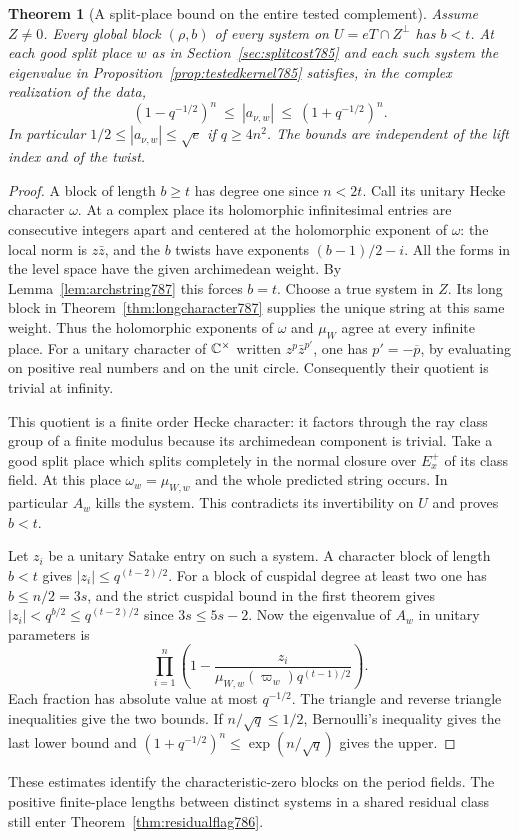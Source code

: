 \documentclass[a4paper,11pt]{article}
\newtheorem{theorem}[proposition]{Theorem}
\theoremstyle{definition}
\theoremstyle{remark}
\numberwithin{equation}{section}
\begin{document}
\begin{theorem}[A split-place bound on the entire tested complement]
\leavevmode\label{thm:compgap787}
Assume \(Z\ne0\). Every global block \((\rho,b)\)
of every system on \(U=eT\cap Z^\perp\) has \(b<t\).
At each good split place \(w\) as in
Section~\ref{sec:splitcost785} and each such system
the eigenvalue in Proposition~\ref{prop:testedkernel785}
satisfies, in the complex realization of the data,
\[
        (1-q^{-1/2})^n\ \le\ |a_{\nu,w}|\
                                \le\ (1+q^{-1/2})^n .
\]
In particular \(1/2\le|a_{\nu,w}|\le\sqrt e\) if
\(q\ge4n^2\). The bounds are independent of the lift
index and of the twist.
\end{theorem}
\begin{proof}
A block of length \(b\ge t\) has degree one since
\(n<2t\). Call its unitary Hecke character \(\omega\).
At a complex place its holomorphic infinitesimal
entries are consecutive integers apart and centered
at the holomorphic exponent of \(\omega\): the local
norm is \(z\bar z\), and the \(b\) twists have
exponents \((b-1)/2-i\). All the forms in the level
space have the given archimedean weight. By
Lemma~\ref{lem:archstring787} this forces \(b=t\).
Choose a true system in \(Z\). Its long block in
Theorem~\ref{thm:longcharacter787} supplies the unique
string at this same weight. Thus the holomorphic
exponents of \(\omega\) and \(\mu_W\) agree at every
infinite place. For a unitary character of
\(\mathbb C^\times\) written \(z^p\bar z^{p'}\), one has
\(p'=-\overline p\), by evaluating on positive real
numbers and on the unit circle. Consequently their
quotient is trivial at infinity.

This quotient is a finite order Hecke character:
it factors through the ray class group of a finite
modulus because its archimedean component is
trivial. Take a good split place which splits
completely in the normal closure over \(E_x^+\) of
its class field. At this place \(\omega_w=\mu_{W,w}\)
and the whole predicted string occurs. In particular
\(A_w\) kills the system. This contradicts its
invertibility on \(U\) and proves \(b<t\).

Let \(z_i\) be a unitary Satake entry on such a
system. A character block of length \(b<t\) gives
\(|z_i|\le q^{(t-2)/2}\). For a block of cuspidal
degree at least two one has \(b\le n/2=3s\), and
the strict cuspidal bound in the first theorem gives
\(|z_i|<q^{b/2}\le q^{(t-2)/2}\) since \(3s\le5s-2\).
Now the eigenvalue of \(A_w\) in unitary parameters is
\[
          \prod_{i=1}^n
             \left(1-\frac{z_i}
                  {\mu_{W,w}(\varpi_w)q^{(t-1)/2}}\right).
\]
Each fraction has absolute value at most \(q^{-1/2}\).
The triangle and reverse triangle inequalities give
the two bounds. If \(n/\sqrt q\le1/2\), Bernoulli's
inequality gives the last lower bound and
\((1+q^{-1/2})^n\le\exp(n/\sqrt q)\) gives the upper.
\end{proof}
These estimates identify the characteristic-zero blocks
on the period fields. The positive finite-place lengths
between distinct systems in a shared residual class
still enter Theorem~\ref{thm:residualflag786}.
\clearpage
\end{document}
